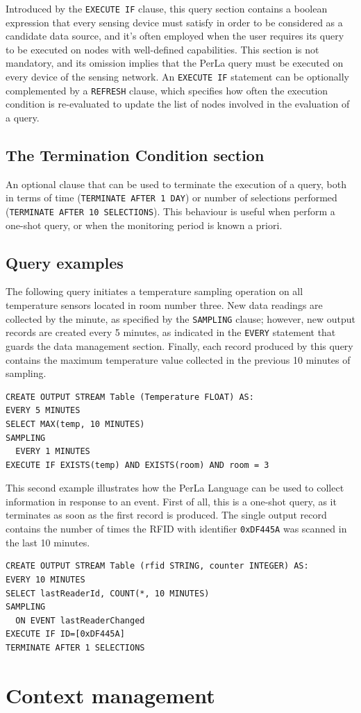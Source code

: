 Introduced by the \texttt{EXECUTE IF} clause, this query section contains a
boolean expression that every sensing device must satisfy in order to be
considered as a candidate data source, and it's often employed when the user
requires its query to be executed on nodes with well-defined capabilities. This
section is not mandatory, and its omission implies that the PerLa query must be
executed on every device of the sensing network. An \texttt{EXECUTE IF}
statement can be optionally complemented by a \texttt{REFRESH} clause, which
specifies how often the execution condition is re-evaluated to update the list
of nodes involved in the evaluation of a query. 

\subsection{The Termination Condition section}

An optional clause that can be used to terminate the execution of a query, both
in terms of time (\lstinline!TERMINATE AFTER 1 DAY!) or number of selections
performed (\lstinline!TERMINATE AFTER 10 SELECTIONS!). This behaviour is useful
when perform a one-shot query, or when the monitoring period is known a priori.

\subsection{Query examples}

The following query initiates a temperature sampling operation on all
temperature sensors located in room number three. New data readings are
collected by the minute, as specified by the \texttt{SAMPLING} clause; however,
new output records are created every 5 minutes, as indicated in the
\texttt{EVERY} statement that guards the data management section. Finally, each
record produced by this query contains the maximum temperature value collected
in the previous 10 minutes of sampling.

\begin{lstlisting}
CREATE OUTPUT STREAM Table (Temperature FLOAT) AS:
EVERY 5 MINUTES
SELECT MAX(temp, 10 MINUTES)
SAMPLING
  EVERY 1 MINUTES
EXECUTE IF EXISTS(temp) AND EXISTS(room) AND room = 3
\end{lstlisting}


This second example illustrates how the PerLa Language can be used to collect
information in response to an event. First of all, this is a one-shot query, as
it terminates as soon as the first record is produced. The single output record
contains the number of times the RFID with identifier \texttt{0xDF445A} was
scanned in the last 10 minutes.

\begin{lstlisting}
CREATE OUTPUT STREAM Table (rfid STRING, counter INTEGER) AS:
EVERY 10 MINUTES
SELECT lastReaderId, COUNT(*, 10 MINUTES)
SAMPLING
  ON EVENT lastReaderChanged
EXECUTE IF ID=[0xDF445A]
TERMINATE AFTER 1 SELECTIONS
\end{lstlisting}


\section{Context management}

